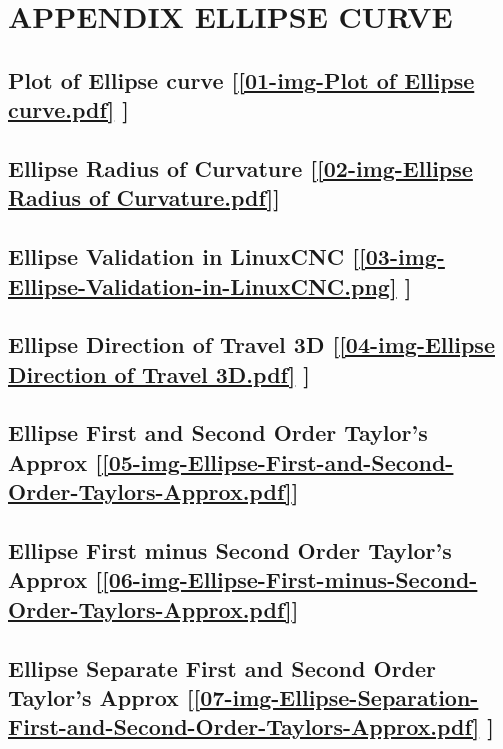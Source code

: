 \section{\textbf{APPENDIX ELLIPSE CURVE}} \label{APPENDIX ELLIPSE CURVE}


\subsection       {Plot of Ellipse curve
	[\ref  {01-img-Plot of Ellipse curve.pdf} ] }
\label{ssec-01-img-Plot of Ellipse curve.pdf}

\subsection       {Ellipse Radius of Curvature
[\ref      {02-img-Ellipse Radius of Curvature.pdf}] }
\label{ssec-02-img-Ellipse Radius of Curvature.pdf}

\subsection       {Ellipse Validation in LinuxCNC
[\ref      {03-img-Ellipse-Validation-in-LinuxCNC.png} ] }
\label{ssec-03-img-Ellipse-Validation-in-LinuxCNC.png}

\subsection     {Ellipse Direction of Travel 3D
[\ref      {04-img-Ellipse Direction of Travel 3D.pdf} ] }
\label{ssec-04-img-Ellipse Direction of Travel 3D.pdf}

\subsection       {Ellipse First and Second Order Taylor's Approx
[\ref      {05-img-Ellipse-First-and-Second-Order-Taylors-Approx.pdf}] }
\label{ssec-05-img-Ellipse-First-and-Second-Order-Taylors-Approx.pdf}

\subsection       {Ellipse First minus Second Order Taylor's Approx
[\ref      {06-img-Ellipse-First-minus-Second-Order-Taylors-Approx.pdf}] }
\label{ssec-06-img-Ellipse-First-minus-Second-Order-Taylors-Approx.pdf}

\subsection       {Ellipse Separate First and Second Order Taylor's Approx
[\ref      {07-img-Ellipse-Separation-First-and-Second-Order-Taylors-Approx.pdf} ] }
\label{ssec-07-img-Ellipse-Separation-First-and-Second-Order-Taylors-Approx.pdf}

